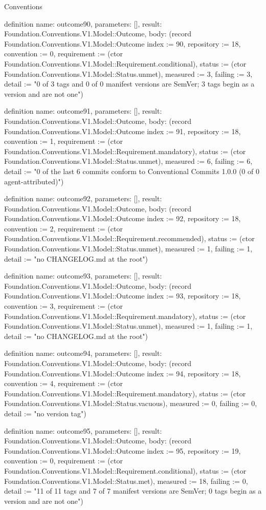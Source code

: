 \begin{lexlean}{Conventions}
\begin{semanticmodule}
definition{
  name: outcome90,
  parameters: [],
  result: Foundation.Conventions.V1.Model::Outcome,
  body: (record Foundation.Conventions.V1.Model::Outcome {index := 90, repository := 18, convention := 0, requirement := (ctor Foundation.Conventions.V1.Model::Requirement.conditional), status := (ctor Foundation.Conventions.V1.Model::Status.unmet), measured := 3, failing := 3, detail := "0 of 3 tags and 0 of 0 manifest versions are SemVer; 3 tags begin as a version and are not one"})
}

definition{
  name: outcome91,
  parameters: [],
  result: Foundation.Conventions.V1.Model::Outcome,
  body: (record Foundation.Conventions.V1.Model::Outcome {index := 91, repository := 18, convention := 1, requirement := (ctor Foundation.Conventions.V1.Model::Requirement.mandatory), status := (ctor Foundation.Conventions.V1.Model::Status.unmet), measured := 6, failing := 6, detail := "0 of the last 6 commits conform to Conventional Commits 1.0.0 (0 of 0 agent-attributed)"})
}

definition{
  name: outcome92,
  parameters: [],
  result: Foundation.Conventions.V1.Model::Outcome,
  body: (record Foundation.Conventions.V1.Model::Outcome {index := 92, repository := 18, convention := 2, requirement := (ctor Foundation.Conventions.V1.Model::Requirement.recommended), status := (ctor Foundation.Conventions.V1.Model::Status.unmet), measured := 1, failing := 1, detail := "no CHANGELOG.md at the root"})
}

definition{
  name: outcome93,
  parameters: [],
  result: Foundation.Conventions.V1.Model::Outcome,
  body: (record Foundation.Conventions.V1.Model::Outcome {index := 93, repository := 18, convention := 3, requirement := (ctor Foundation.Conventions.V1.Model::Requirement.mandatory), status := (ctor Foundation.Conventions.V1.Model::Status.unmet), measured := 1, failing := 1, detail := "no CHANGELOG.md at the root"})
}

definition{
  name: outcome94,
  parameters: [],
  result: Foundation.Conventions.V1.Model::Outcome,
  body: (record Foundation.Conventions.V1.Model::Outcome {index := 94, repository := 18, convention := 4, requirement := (ctor Foundation.Conventions.V1.Model::Requirement.mandatory), status := (ctor Foundation.Conventions.V1.Model::Status.vacuous), measured := 0, failing := 0, detail := "no version tag"})
}

definition{
  name: outcome95,
  parameters: [],
  result: Foundation.Conventions.V1.Model::Outcome,
  body: (record Foundation.Conventions.V1.Model::Outcome {index := 95, repository := 19, convention := 0, requirement := (ctor Foundation.Conventions.V1.Model::Requirement.conditional), status := (ctor Foundation.Conventions.V1.Model::Status.met), measured := 18, failing := 0, detail := "11 of 11 tags and 7 of 7 manifest versions are SemVer; 0 tags begin as a version and are not one"})
}


\end{semanticmodule}
\end{lexlean}
